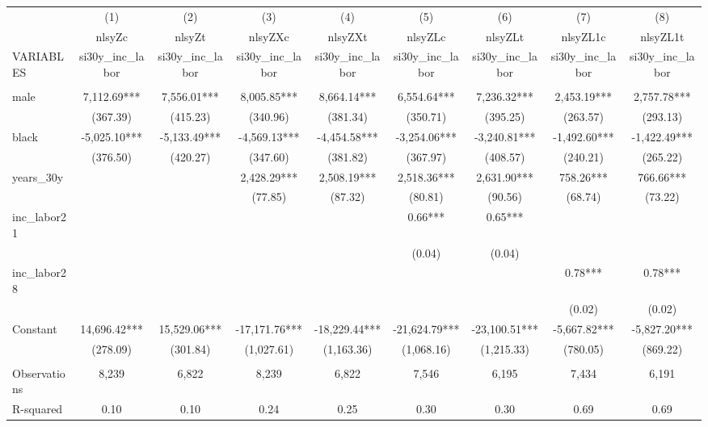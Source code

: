 \begin{tabular}{lcccccccc} \hline
 & (1) & (2) & (3) & (4) & (5) & (6) & (7) & (8) \\
 & nlsyZc & nlsyZt & nlsyZXc & nlsyZXt & nlsyZLc & nlsyZLt & nlsyZL1c & nlsyZL1t \\
VARIABLES & si30y\_inc\_labor & si30y\_inc\_labor & si30y\_inc\_labor & si30y\_inc\_labor & si30y\_inc\_labor & si30y\_inc\_labor & si30y\_inc\_labor & si30y\_inc\_labor \\ \hline
 &  &  &  &  &  &  &  &  \\
male & 7,112.69*** & 7,556.01*** & 8,005.85*** & 8,664.14*** & 6,554.64*** & 7,236.32*** & 2,453.19*** & 2,757.78*** \\
 & (367.39) & (415.23) & (340.96) & (381.34) & (350.71) & (395.25) & (263.57) & (293.13) \\
black & -5,025.10*** & -5,133.49*** & -4,569.13*** & -4,454.58*** & -3,254.06*** & -3,240.81*** & -1,492.60*** & -1,422.49*** \\
 & (376.50) & (420.27) & (347.60) & (381.82) & (367.97) & (408.57) & (240.21) & (265.22) \\
years\_30y &  &  & 2,428.29*** & 2,508.19*** & 2,518.36*** & 2,631.90*** & 758.26*** & 766.66*** \\
 &  &  & (77.85) & (87.32) & (80.81) & (90.56) & (68.74) & (73.22) \\
inc\_labor21 &  &  &  &  & 0.66*** & 0.65*** &  &  \\
 &  &  &  &  & (0.04) & (0.04) &  &  \\
inc\_labor28 &  &  &  &  &  &  & 0.78*** & 0.78*** \\
 &  &  &  &  &  &  & (0.02) & (0.02) \\
Constant & 14,696.42*** & 15,529.06*** & -17,171.76*** & -18,229.44*** & -21,624.79*** & -23,100.51*** & -5,667.82*** & -5,827.20*** \\
 & (278.09) & (301.84) & (1,027.61) & (1,163.36) & (1,068.16) & (1,215.33) & (780.05) & (869.22) \\
 &  &  &  &  &  &  &  &  \\
Observations & 8,239 & 6,822 & 8,239 & 6,822 & 7,546 & 6,195 & 7,434 & 6,191 \\
 R-squared & 0.10 & 0.10 & 0.24 & 0.25 & 0.30 & 0.30 & 0.69 & 0.69 \\ \hline
\end{tabular}
